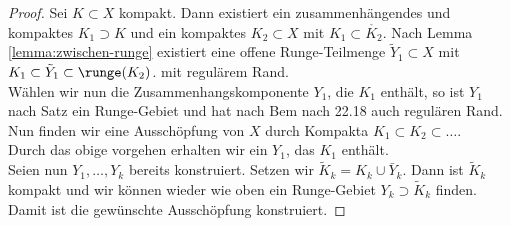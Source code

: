 \begin{proof}
  Sei $K \subset X$ kompakt. Dann existiert ein zusammenhängendes und
  kompaktes $K_1 \supset K$ und ein kompaktes $K_2 \subset X$ mit $K_1
  \subset \mathring{K_2}$. Nach Lemma \ref{lemma:zwischen-runge}
  existiert eine offene Runge-Teilmenge $\tilde Y_1 \subset X$ mit
  $K_1 \subset \tilde Y_1 \subset \runge(K_2)$. mit regulärem Rand. \\
  Wählen wir nun die Zusammenhangskomponente $Y_1$, die $K_1$ enthält,
  so ist $Y_1$ nach Satz \label{thm:runge-zshkomp} ein Runge-Gebiet
  und hat nach Bem nach 22.18 auch regulären Rand. \\
  Nun finden wir eine Ausschöpfung von $X$ durch Kompakta $K_1 \subset
  K_2 \subset \dots$. \\
  Durch das obige vorgehen erhalten wir ein $Y_1$, das $K_1$
  enthält.\\
  Seien nun $Y_1, \dots, Y_k$ bereits konstruiert. Setzen wir $\tilde
  K_k = K_k \cup \bar Y_k$. Dann ist $\tilde K_k$ kompakt und wir
  können wieder wie oben ein Runge-Gebiet $Y_k \supset \tilde K_k$
  finden.\\
  Damit ist die gewünschte Ausschöpfung konstruiert.
\end{proof}

